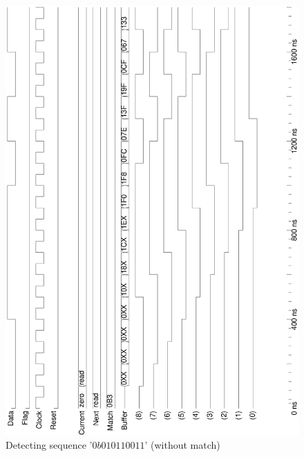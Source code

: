 \documentclass[10pt,a4paper]{report}
\begin{document}
\begin{figure} \center

\includegraphics[scale=0.49,angle=-90]{graphs/seq_test2.UNMATCHED.ps}
\caption{\small{Detecting sequence '$0b010110011$' (without match)}} \label{wave:usd:t2w1}


\end{figure}
\end{document}
